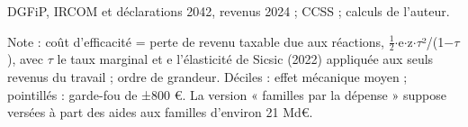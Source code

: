 DGFiP, IRCOM et déclarations 2042, revenus 2024 ; CCSS ; calculs de l'auteur.\par Note : coût d'efficacité = perte de revenu taxable due aux réactions, $\frac{1}{2}$$\cdot$e$\cdot$z$\cdot$$\tau$²/(1$-$$\tau$), avec $\tau$ le taux marginal et e l'élasticité de Sicsic (2022) appliquée aux seuls revenus du travail ; ordre de grandeur. Déciles : effet mécanique moyen ; pointillés : garde-fou de ±800 \euro{}. La version « familles par la dépense » suppose versées à part des aides aux familles d'environ 21 Md\euro{}.
